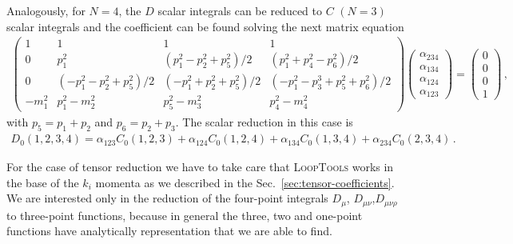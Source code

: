 Analogously, for $N=4$, the $D$ scalar integrals can be reduced to $C$ $(N=3)$ scalar integrals and the coefficient can be found solving the next matrix equation
\begin{align}
\begin{pmatrix}
1 & 1 & 1 & 1 \\
0 & p_1^2 & (p_1^2-p_2^2+p_5^2)/2  & (p_1^2+p_4^2-p_6^2)/2\\
0 & (-p_1^2-p_2^2+p_5^2)/2 & (-p_1^2+p_2^2+p_5^2)/2  & (-p_1^2-p_3^3+p_5^2+p_6^2)/2\\
 -m_1^2 & p_1^2-m_2^2 & p_5^2-m_3^2 & p_4^2-m_4^2
\end{pmatrix}
\begin{pmatrix}
\alpha_{234} \\ \alpha_{134} \\ \alpha_{124} \\ \alpha_{123}
\end{pmatrix}=
\begin{pmatrix}
0 \\ 0 \\ 0 \\ 1
\end{pmatrix}\,,
\end{align}
%
with $p_5=p_1+p_2$ and $p_6=p_2+p_3$.
%
The scalar reduction in this case is
\begin{align}
D_0(1,2,3,4)= \alpha_{123}C_0(1,2,3)+\alpha_{124}C_0(1,2,4)+\alpha_{134}C_0(1,3,4)+\alpha_{234}C_0(2,3,4)\,.
\end{align}

For the case of tensor reduction we have to take care that \textsc{LoopTools} works in the base of the $k_i$ momenta as we described in the Sec.~\ref{sec:tensor-coefficients}. 
%
We are interested only in the reduction of the four-point integrals $D_{\mu}$, $D_{\mu\nu}$,$D_{\mu\nu\rho}$ to three-point functions, because in general the three, two and one-point functions have analytically representation that we are able to find. 


